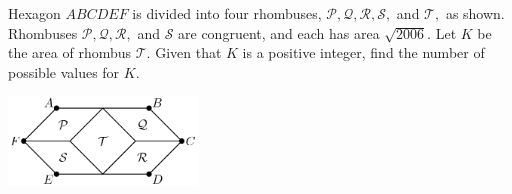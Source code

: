 Hexagon $ABCDEF$ is divided into four rhombuses, $\mathcal{P, Q, R, S,}$ and $\mathcal{T,}$ as shown.  Rhombuses $\mathcal{P, Q, R,}$ and $\mathcal{S}$ are congruent, and each has area $\sqrt{2006}$.  Let $K$ be the area of rhombus $\mathcal{T}$.  Given that $K$ is a positive integer, find the number of possible values for $K$.

\begin{center}
\includegraphics[width = 50.400000000000006mm]{img/fig0.png}
\end{center}